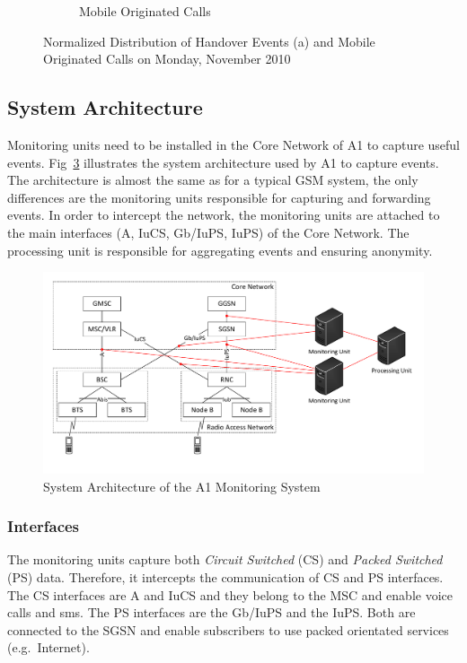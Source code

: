 \begin{figure}
\begin{subfigure}[b]{0.5\textwidth}
		\caption{Mobile Originated Calls}
		\label{fig:distmoc}
	\end{subfigure}
	\caption{Normalized Distribution of Handover Events (a) and Mobile Originated Calls on Monday,  November 2010}\label{fig:distevents}
\end{figure}

\subsection{System Architecture}
Monitoring units need to be installed in the Core Network of A1 to capture useful events. Fig~\ref{fig:A1Network} illustrates the system architecture used by A1 to capture events. The architecture is almost the same as for a typical GSM system, the only differences are the monitoring units responsible for capturing and forwarding events.
In order to intercept the network, the monitoring units are attached to the main interfaces (A, IuCS, Gb/IuPS, IuPS) of the Core Network. The processing unit is responsible for aggregating events and ensuring anonymity.
\begin{figure}
	\centering
	\includegraphics[width=\linewidth]{./images/A1Network}
	\caption{System Architecture of the A1 Monitoring System}
	\label{fig:A1Network}
\end{figure}

\subsubsection{Interfaces}
The monitoring units capture both \emph{Circuit Switched} (CS) and \emph{Packed Switched} (PS) data. Therefore, it intercepts the communication of CS and PS interfaces. The CS interfaces are A and IuCS and they belong to the MSC and enable voice calls and sms. The PS interfaces are the Gb/IuPS and the IuPS. Both are connected to the SGSN and enable subscribers to use packed orientated services (e.g.\ Internet).
